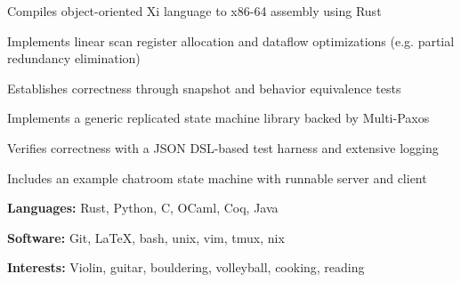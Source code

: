 \documentclass{resume}
\begin{document}
\begin{projects}
	\begin{description}
		\item Compiles object-oriented Xi language to x86-64 assembly using Rust
		\item Implements linear scan register allocation and dataflow optimizations (e.g. partial redundancy elimination)
		\item Establishes correctness through snapshot and behavior equivalence tests
	\end{description}

	\begin{description}
		\item Implements a generic replicated state machine library backed by Multi-Paxos
		\item Verifies correctness with a JSON DSL-based test harness and extensive logging
		\item Includes an example chatroom state machine with runnable server and client
	\end{description}
\end{projects}

\begin{skills}
	\begin{description}
		\item \textbf{Languages:} Rust, Python, C, OCaml, Coq, Java
		\item \textbf{Software:} Git, LaTeX, bash, unix, vim, tmux, nix
		\item \textbf{Interests:} Violin, guitar, bouldering, volleyball, cooking, reading
	\end{description}
\end{skills}
\end{document}
